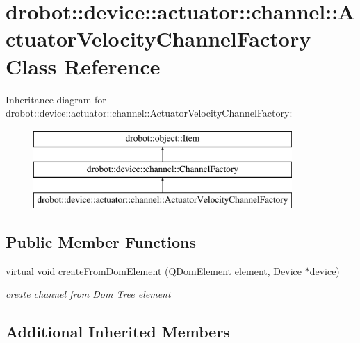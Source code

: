 \hypertarget{classdrobot_1_1device_1_1actuator_1_1channel_1_1ActuatorVelocityChannelFactory}{\section{drobot\-:\-:device\-:\-:actuator\-:\-:channel\-:\-:Actuator\-Velocity\-Channel\-Factory Class Reference}
\label{classdrobot_1_1device_1_1actuator_1_1channel_1_1ActuatorVelocityChannelFactory}
}
Inheritance diagram for drobot\-:\-:device\-:\-:actuator\-:\-:channel\-:\-:Actuator\-Velocity\-Channel\-Factory\-:\begin{figure}[H]
\begin{center}
\leavevmode
\includegraphics[height=3.000000cm]{classdrobot_1_1device_1_1actuator_1_1channel_1_1ActuatorVelocityChannelFactory}
\end{center}
\end{figure}
\subsection*{Public Member Functions}
\begin{DoxyCompactItemize}
\item 
virtual void \hyperlink{classdrobot_1_1device_1_1actuator_1_1channel_1_1ActuatorVelocityChannelFactory_ae60b06b9376c9b142137d97849dc8659}{create\-From\-Dom\-Element} (Q\-Dom\-Element element, \hyperlink{classdrobot_1_1device_1_1Device}{Device} $\ast$device)
\begin{DoxyCompactList}\small\item\em create channel from Dom Tree element \end{DoxyCompactList}\end{DoxyCompactItemize}
\subsection*{Additional Inherited Members}


